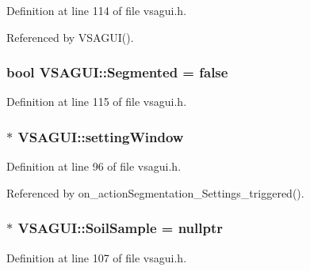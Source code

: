 Definition at line 114 of file vsagui.\+h.



Referenced by V\+S\+A\+G\+U\+I().

\hypertarget{class_v_s_a_g_u_i_a7684dfb6ffa5e169d611f2070b8e5041}{}
\subsubsection[{Segmented}]{\setlength{\rightskip}{0pt plus 5cm}bool V\+S\+A\+G\+U\+I\+::\+Segmented = false\hspace{0.3cm}{\ttfamily [private]}}\label{class_v_s_a_g_u_i_a7684dfb6ffa5e169d611f2070b8e5041}


Definition at line 115 of file vsagui.\+h.

\hypertarget{class_v_s_a_g_u_i_a76c2e60393e9a3d61bcc22fd02b80b87}{}
\subsubsection[{setting\+Window}]{$\ast$ V\+S\+A\+G\+U\+I\+::setting\+Window\hspace{0.3cm}{\ttfamily [private]}}\label{class_v_s_a_g_u_i_a76c2e60393e9a3d61bcc22fd02b80b87}


Definition at line 96 of file vsagui.\+h.



Referenced by on\+\_\+action\+Segmentation\+\_\+\+Settings\+\_\+triggered().

\hypertarget{class_v_s_a_g_u_i_ac90517c9baea0a75455d43d5eb77d3e7}{}
\subsubsection[{Soil\+Sample}]{$\ast$ V\+S\+A\+G\+U\+I\+::\+Soil\+Sample = nullptr\hspace{0.3cm}{\ttfamily [private]}}\label{class_v_s_a_g_u_i_ac90517c9baea0a75455d43d5eb77d3e7}


Definition at line 107 of file vsagui.\+h.



